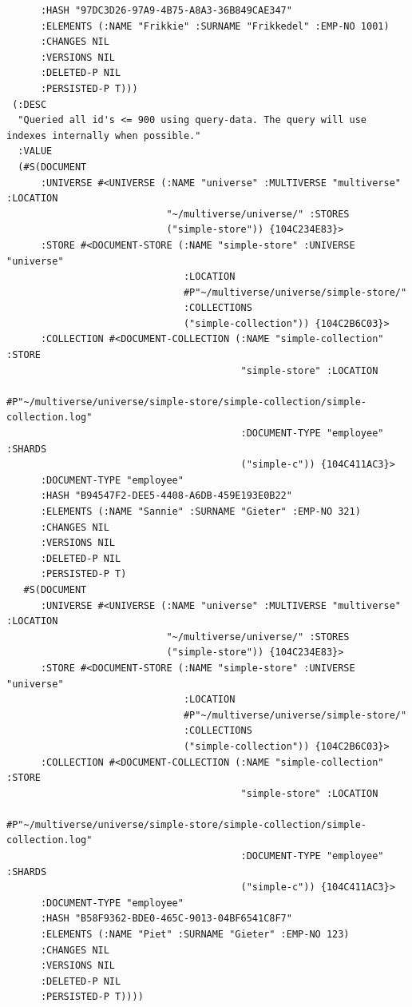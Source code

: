 \documentclass[11pt]{article}
\begin{document}
\begin{verbatim}
      :HASH "97DC3D26-97A9-4B75-A8A3-36B849CAE347"
      :ELEMENTS (:NAME "Frikkie" :SURNAME "Frikkedel" :EMP-NO 1001)
      :CHANGES NIL
      :VERSIONS NIL
      :DELETED-P NIL
      :PERSISTED-P T)))
 (:DESC
  "Queried all id's <= 900 using query-data. The query will use indexes internally when possible."
  :VALUE
  (#S(DOCUMENT
      :UNIVERSE #<UNIVERSE (:NAME "universe" :MULTIVERSE "multiverse" :LOCATION
                            "~/multiverse/universe/" :STORES
                            ("simple-store")) {104C234E83}>
      :STORE #<DOCUMENT-STORE (:NAME "simple-store" :UNIVERSE "universe"
                               :LOCATION
                               #P"~/multiverse/universe/simple-store/"
                               :COLLECTIONS
                               ("simple-collection")) {104C2B6C03}>
      :COLLECTION #<DOCUMENT-COLLECTION (:NAME "simple-collection" :STORE
                                         "simple-store" :LOCATION
                                         #P"~/multiverse/universe/simple-store/simple-collection/simple-collection.log"
                                         :DOCUMENT-TYPE "employee" :SHARDS
                                         ("simple-c")) {104C411AC3}>
      :DOCUMENT-TYPE "employee"
      :HASH "B94547F2-DEE5-4408-A6DB-459E193E0B22"
      :ELEMENTS (:NAME "Sannie" :SURNAME "Gieter" :EMP-NO 321)
      :CHANGES NIL
      :VERSIONS NIL
      :DELETED-P NIL
      :PERSISTED-P T)
   #S(DOCUMENT
      :UNIVERSE #<UNIVERSE (:NAME "universe" :MULTIVERSE "multiverse" :LOCATION
                            "~/multiverse/universe/" :STORES
                            ("simple-store")) {104C234E83}>
      :STORE #<DOCUMENT-STORE (:NAME "simple-store" :UNIVERSE "universe"
                               :LOCATION
                               #P"~/multiverse/universe/simple-store/"
                               :COLLECTIONS
                               ("simple-collection")) {104C2B6C03}>
      :COLLECTION #<DOCUMENT-COLLECTION (:NAME "simple-collection" :STORE
                                         "simple-store" :LOCATION
                                         #P"~/multiverse/universe/simple-store/simple-collection/simple-collection.log"
                                         :DOCUMENT-TYPE "employee" :SHARDS
                                         ("simple-c")) {104C411AC3}>
      :DOCUMENT-TYPE "employee"
      :HASH "B58F9362-BDE0-465C-9013-04BF6541C8F7"
      :ELEMENTS (:NAME "Piet" :SURNAME "Gieter" :EMP-NO 123)
      :CHANGES NIL
      :VERSIONS NIL
      :DELETED-P NIL
      :PERSISTED-P T))))
\end{verbatim}
\end{document}
